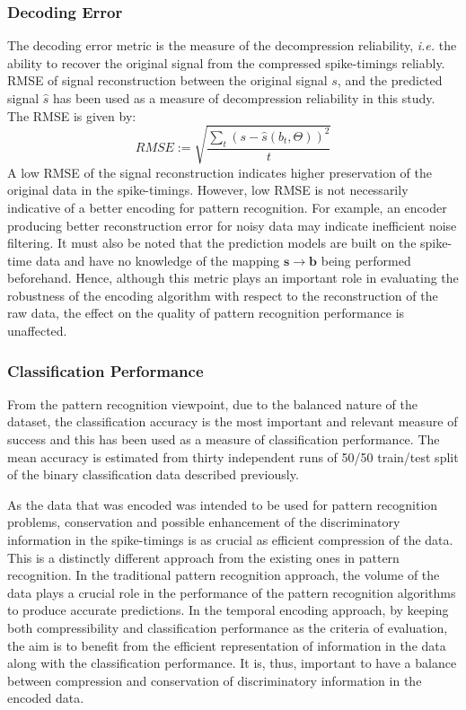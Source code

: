 \subsubsection{Decoding Error} The decoding error metric is the measure of the decompression reliability, \emph{i.e.} the ability to recover the original signal from the compressed spike-timings reliably. RMSE of signal reconstruction between the original signal $s$, and the predicted signal $\hat{s}$ has been used as a measure of decompression reliability in this study. The RMSE is given by:
\begin{equation}
	\displaystyle RMSE:= \sqrt{\frac{\sum_t(s-\hat{s}(b_t,\Theta))^2}{t}}
\end{equation}
A low RMSE of the signal reconstruction indicates higher preservation of the original data in the spike-timings. However, low RMSE is not necessarily indicative of a better encoding for pattern recognition. For example, an encoder producing better reconstruction error for noisy data may indicate inefficient noise filtering. It must also be noted that the prediction models are built on the spike-time data and have no knowledge of the mapping $\mathbf{s}\rightarrow \mathbf{b}$ being performed beforehand. Hence, although this metric plays an important role in evaluating the robustness of the encoding algorithm with respect to the reconstruction of the raw data, the effect on the quality of pattern recognition performance is unaffected.
	
\subsubsection{Classification Performance} From the pattern recognition viewpoint, due to the balanced nature of the dataset, the classification accuracy is the most important and relevant measure of success and this has been used as a measure of classification performance. The mean accuracy is estimated from thirty independent runs of 50/50 train/test split of the binary classification data described previously. 

As the data that was encoded was intended to be used for pattern recognition problems, conservation and possible enhancement of the discriminatory information in the spike-timings is as crucial as efficient compression of the data. This is a distinctly different approach from the existing ones in pattern recognition. In the traditional pattern recognition approach, the volume of the data plays a crucial role in the performance of the pattern recognition algorithms to produce accurate predictions. In the temporal encoding approach, by keeping both compressibility and classification performance as the criteria of evaluation, the aim is to benefit from the efficient representation of information in the data along with the classification performance. It is, thus, important to have a balance between compression and conservation of discriminatory information in the encoded data. 

